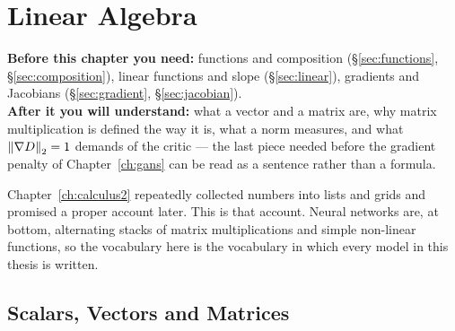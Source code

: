 \chapter{Linear Algebra}
\label{ch:linalg}

\begin{tcolorbox}[feynbox={Sky}{BBg},title={Before and After}]
\textbf{Before this chapter you need:} functions and composition
(\S\ref{sec:functions}, \S\ref{sec:composition}), linear functions and slope
(\S\ref{sec:linear}), gradients and Jacobians
(\S\ref{sec:gradient}, \S\ref{sec:jacobian}).\\
\textbf{After it you will understand:} what a vector and a matrix are, why matrix
multiplication is defined the way it is, what a norm measures, and what
$\left\|\nabla D\right\|_2 = 1$ demands of the critic --- the last piece needed before the
gradient penalty of Chapter~\ref{ch:gans} can be read as a sentence rather than a
formula.
\end{tcolorbox}

Chapter~\ref{ch:calculus2} repeatedly collected numbers into lists and grids and
promised a proper account later. This is that account. Neural networks are, at
bottom, alternating stacks of matrix multiplications and simple non-linear
functions, so the vocabulary here is the vocabulary in which every model in this
thesis is written.

\section{Scalars, Vectors and Matrices}
\label{sec:vectors}



